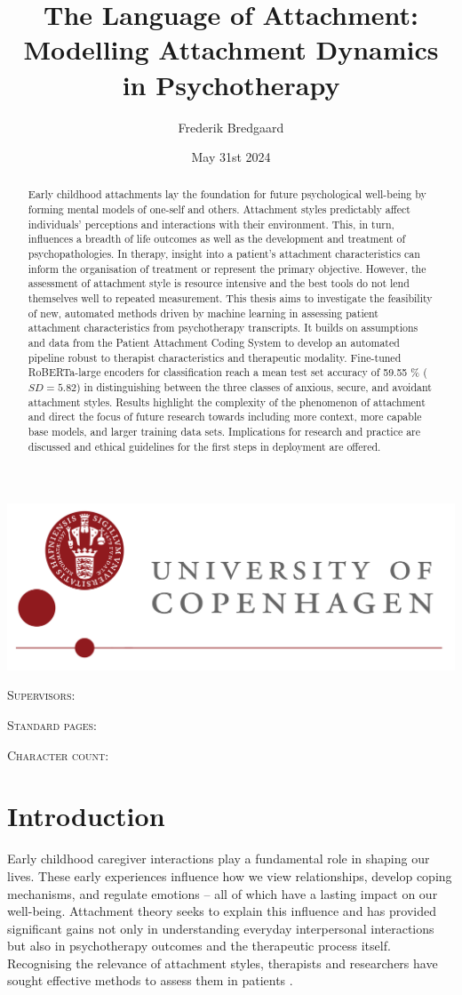 \documentclass[12pt]{report}
\title{The Language of Attachment: Modelling Attachment Dynamics in Psychotherapy}
\author{Frederik Bredgaard}
\date{May 31st 2024}
\makeatletter
\newcommand{\supervisorOne}[1]{\def\@supervisorOne{#1}} %
\newcommand{\supervisorTwo}[1]{\def\@supervisorTwo{#1}} %
\newcommand{\university}[1]{\def\@university{#1}} %
\newcommand{\faculty}[1]{\def\@faculty{#1}} %
\newcommand{\pageCount}[1]{\def\@pageCount{#1}} %
\newcommand{\charCount}[1]{\def\@charCount{#1}} %
\renewcommand{\maketitle}{
    \begin{titlepage}
        \centering
        \includegraphics[width=\textwidth]{figures/ku_logo_uk_hh.png}\par\vspace{1cm} %
        \vspace{1cm}
        \textsc{\LARGE \@title}\par\vspace{1.5cm} %
        \textsc{\large \@author}\par\vspace{1cm} %
        \textsc{\large Supervisors:}\par %
        \textsc{\large \@supervisorOne}\par %
        \textsc{\large \@supervisorTwo}\par\vspace{1cm} %
        \textsc{\small Standard pages: \@pageCount}\par %
        \textsc{\small Character count: \@charCount}\par %
        \vfill
        \@date\par\vspace{0.5cm} %
        \textsc{\large \@faculty}\par %
        \textsc{\large \@university}\par %
    \end{titlepage}
}
\makeatother
\begin{document}
\maketitle
\begin{abstract}
    Early childhood attachments lay the foundation for future psychological well-being by forming mental models of one-self and others.
    Attachment styles predictably affect individuals' perceptions and interactions with their environment.
    This, in turn, influences a breadth of life outcomes as well as the development and treatment of psychopathologies.
    In therapy, insight into a patient's attachment characteristics can inform the organisation of treatment or represent the primary objective.
    However, the assessment of attachment style is resource intensive and the best tools do not lend themselves well to repeated measurement.
    This thesis aims to investigate the feasibility of new, automated methods driven by machine learning in assessing patient attachment characteristics from psychotherapy transcripts.
    It builds on assumptions and data from the Patient Attachment Coding System \cite{Talia2017} to develop an automated pipeline robust to therapist characteristics and therapeutic modality.
    Fine-tuned RoBERTa-large encoders for classification reach a mean test set accuracy of 59.55 \% ($SD=5.82$) in distinguishing between the three classes of anxious, secure, and avoidant attachment styles.
    Results highlight the complexity of the phenomenon of attachment and direct the focus of future research towards including more context, more capable base models, and larger training data sets.
    Implications for research and practice are discussed and ethical guidelines for the first steps in deployment are offered.
\end{abstract}
\tableofcontents

\chapter*{Introduction}
Early childhood caregiver interactions play a fundamental role in shaping our lives.
These early experiences influence how we view relationships, develop coping mechanisms, and regulate emotions -- all of which have a lasting impact on our well-being.
Attachment theory seeks to explain this influence and has provided significant gains not only in understanding everyday interpersonal interactions but also in psychotherapy outcomes and the therapeutic process itself.
Recognising the relevance of attachment styles, therapists and researchers have sought effective methods to assess them in patients .
\end{document}

